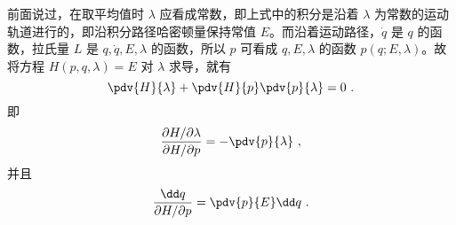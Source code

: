 前面说过，在取平均值时 $\lambda$ 应看成常数，即上式中的积分是沿着 $\lambda$ 为常数的运动轨道进行的，即沿积分路径哈密顿量保持常值 $E$。而沿着运动路径，$\dot q$ 是 $q$ 的函数，拉氏量 $L$ 是 $q,\dot q,E,\lambda$ 的函数，所以 $p$ 可看成 $q,E,\lambda$ 的函数 $p(q;E,\lambda)$。故将方程 $H(p,q,\lambda)=E$ 对 $\lambda$ 求导，就有
\begin{equation}
\pdv{H}{\lambda}+\pdv{H}{p}\pdv{p}{\lambda}=0~.
\end{equation}
即 
\begin{equation}
\frac{\partial{H}/\partial{\lambda}}{\partial{H}/\partial{p}}=-\pdv{p}{\lambda}~,
\end{equation}
并且
\begin{equation}
\frac{\dd q}{\partial{H}/\partial{p}}=\pdv{p}{E}\dd q~.
\end{equation}


